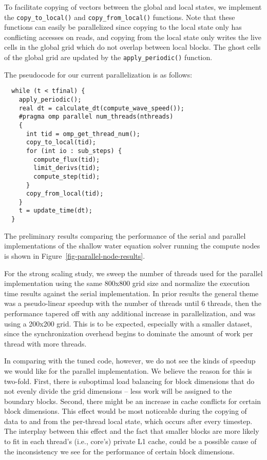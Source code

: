 To facilitate copying of vectors between the global and local states, we
implement the \texttt{copy\_to\_local()} and \texttt{copy\_from\_local()}
functions. Note that these functions can easily be parallelized since
copying to the local state only has conflicting accesses on reads, and
copying from the local state only writes the live cells in the global
grid which do not overlap between local blocks. The ghost cells of the
global grid are updated by the \texttt{apply\_periodic()} function.

The pseudocode for our current parallelization is as follows:

\begin{verbatim}
  while (t < tfinal) {
    apply_periodic();
    real dt = calculate_dt(compute_wave_speed());
    #pragma omp parallel num_threads(nthreads)
    {
      int tid = omp_get_thread_num();
      copy_to_local(tid);
      for (int io : sub_steps) {
        compute_flux(tid);
        limit_derivs(tid);
        compute_step(tid);
      }
      copy_from_local(tid);
    }
    t = update_time(dt);
  }
\end{verbatim}



The preliminary results comparing the performance of the serial and
parallel implementations of the shallow water equation solver running the
compute nodes is shown in Figure~\ref{fig-parallel-node-results}.

For the strong scaling study, we sweep the number of threads used for the
parallel implementation using the same 800x800 grid size and normalize
the execution time results against the serial implementation. In prior results the general
theme was a pseudo-linear speedup with the number of threads until 6
threads, then the performance tapered off with any additional increase in
parallelization, and was using a 200x200 grid. This is to be expected, especially with a smaller
dataset, since the synchronization overhead begins to dominate the amount
of work per thread with more threads.

In comparing with the tuned code, however, we do not see the kinds of speedup
we would like for the parallel implementation.  We believe the reason for this is
two-fold. First, there is suboptimal load balancing for block dimensions
that do not evenly divide the grid dimensions -- less work will be assigned to the
boundary blocks. Second, there might be an increase in cache conflicts
for certain block dimensions. This effect would be most noticeable during
the copying of data to and from the per-thread local state, which occurs
after every timestep. The interplay between this effect and the fact that
smaller blocks are more likely to fit in each thread's (i.e., core's)
private L1 cache, could be a possible cause of the inconsistency we see
for the performance of certain block dimensions.

